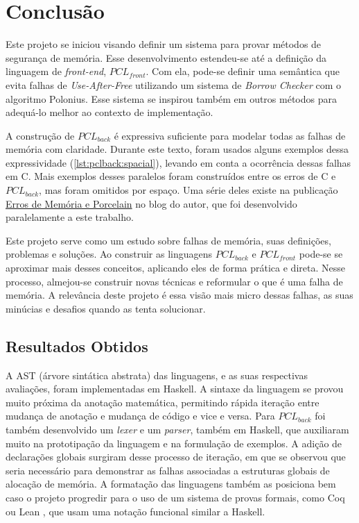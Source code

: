 \chapter{Conclusão}
\label{chap7}

Este projeto se iniciou visando definir um sistema para provar métodos de segurança de memória. Esse desenvolvimento estendeu-se até a definição da linguagem de \emph{front-end}, $PCL_{front}$. Com ela, pode-se definir uma semântica que evita falhas de \emph{Use-After-Free} utilizando um sistema de \emph{Borrow Checker} com o algoritmo Polonius. Esse sistema se inspirou também em outros métodos para adequá-lo melhor ao contexto de implementação.

A construção de $PCL_{back}$ é expressiva suficiente para modelar todas as falhas de memória com claridade. Durante este texto, foram usados alguns exemplos dessa expressividade (\ref{lst:pclback:spacial}), levando em conta a ocorrência dessas falhas em C. Mais exemplos desses paralelos foram construídos entre os erros de C e $PCL_{back}$, mas foram omitidos por espaço. Uma série deles existe na publicação \href{https://sacolle.github.io/blog/posts/porcelain-emulando-os-erros-de-memoria-de-c/}{Erros de Memória e Porcelain} no blog do autor, que foi desenvolvido paralelamente a este trabalho.

Este projeto serve como um estudo sobre falhas de memória, suas definições, problemas e soluções. Ao construir as linguagens $PCL_{back}$ e $PCL_{front}$ pode-se se aproximar mais desses conceitos, aplicando eles de forma prática e direta. Nesse processo, almejou-se construir novas técnicas e reformular o que é uma falha de memória. A relevância deste projeto é essa visão mais micro dessas falhas, as suas minúcias e desafios quando as tenta solucionar.

\section{Resultados Obtidos}

A AST (árvore sintática abstrata) das linguagens, e as suas respectivas avaliações, foram implementadas em Haskell. A sintaxe da linguagem se provou muito próxima da anotação matemática, permitindo rápida iteração entre mudança de anotação e mudança de código e vice e versa. Para $PCL_{back}$ foi também desenvolvido um \emph{lexer} e um \emph{parser}, também em Haskell, que auxiliaram muito na prototipação da linguagem e na formulação de exemplos. A adição de declarações globais surgiram desse processo de iteração, em que se observou que seria necessário para demonstrar as falhas associadas a estruturas globais de alocação de memória. A formatação das linguagens também as posiciona bem caso o projeto progredir para o uso de um sistema de provas formais, como Coq \cite{COQ} ou Lean \cite{LEAN4}, que usam uma notação funcional similar a Haskell.
